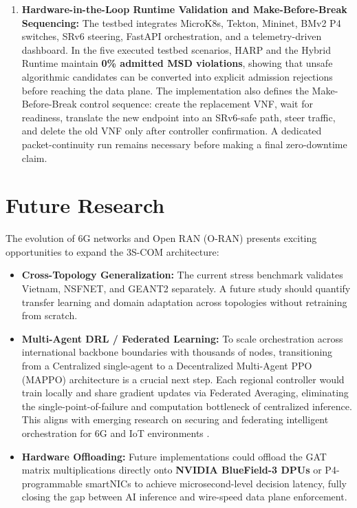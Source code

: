 \documentclass[12pt, a4paper, reqno, oneside]{book}
\begin{document}
\begin{enumerate}
    \item \textbf{Hardware-in-the-Loop Runtime Validation and Make-Before-Break Sequencing:} The testbed integrates MicroK8s, Tekton, Mininet, BMv2 P4 switches, SRv6 steering, FastAPI orchestration, and a telemetry-driven dashboard. In the five executed testbed scenarios, HARP and the Hybrid Runtime maintain \textbf{0\% admitted MSD violations}, showing that unsafe algorithmic candidates can be converted into explicit admission rejections before reaching the data plane. The implementation also defines the Make-Before-Break control sequence: create the replacement VNF, wait for readiness, translate the new endpoint into an SRv6-safe path, steer traffic, and delete the old VNF only after controller confirmation. A dedicated packet-continuity run remains necessary before making a final zero-downtime claim.
\end{enumerate}

\section{Future Research}
The evolution of 6G networks and Open RAN (O-RAN) presents exciting opportunities to expand the 3S-COM architecture:
\begin{itemize}
    \item \textbf{Cross-Topology Generalization:} The current stress benchmark validates Vietnam, NSFNET, and GEANT2 separately. A future study should quantify transfer learning and domain adaptation across topologies without retraining from scratch.
    \item \textbf{Multi-Agent DRL / Federated Learning:} To scale orchestration across international backbone boundaries with thousands of nodes, transitioning from a Centralized single-agent to a Decentralized Multi-Agent PPO (MAPPO) architecture is a crucial next step. Each regional controller would train locally and share gradient updates via Federated Averaging, eliminating the single-point-of-failure and computation bottleneck of centralized inference. This aligns with emerging research on securing and federating intelligent orchestration for 6G and IoT environments \cite{kantarci2025federated, wang2022securing}.
    \item \textbf{Hardware Offloading:} Future implementations could offload the GAT matrix multiplications directly onto \textbf{NVIDIA BlueField-3 DPUs} or P4-programmable smartNICs to achieve microsecond-level decision latency, fully closing the gap between AI inference and wire-speed data plane enforcement.
\end{itemize}
\end{document}
